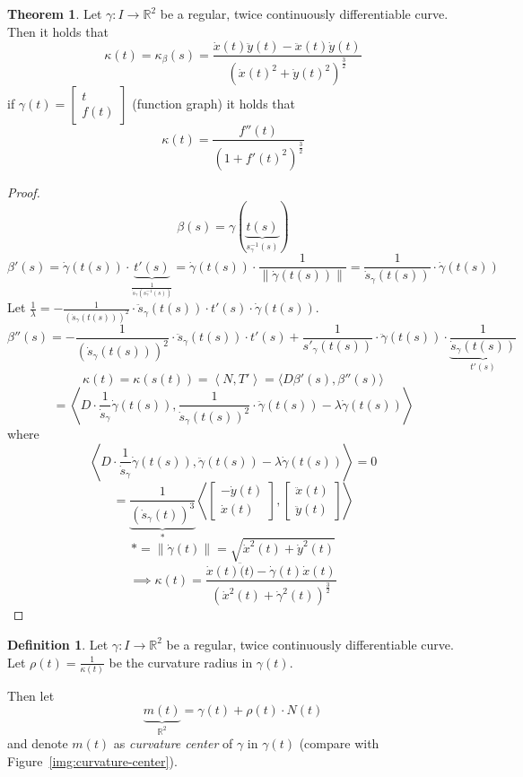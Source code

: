 \documentclass[a4paper,landscape,twocolumn]{article}
\theoremstyle{definition}
\newtheorem{theorem}{Theorem}
\newtheorem{defi}{Definition}
\newcommand\norm[1]{\left\|#1\right\|}
\newcommand\ang[2]{\left\langle#1,#2\right\rangle}
\begin{document}
\begin{theorem}
  Let $\gamma: I \to \mathbb R^2$ be a regular, twice continuously differentiable
  curve. Then it holds that
  \[ \kappa(t) = \kappa_{\beta}(s) = \frac{\dot{x}(t) \ddot{y}(t) - \ddot{x}(t) \dot{y}(t)}{(\dot{x}(t)^2 + \dot{y}(t)^2)^{\frac32}} \]
  if $\gamma(t) = \begin{bmatrix} t \\ f(t) \end{bmatrix}$ (function graph) it holds that
  \[ \kappa(t) = \frac{f''(t)}{(1 + f'(t)^2)^{\frac32}} \]
\end{theorem}

\begin{proof}
  \[ \beta(s) = \gamma(\underbrace{t(s)}_{s_\gamma^{-1}(s)}) \]
  \[
    \beta'(s) =
    \dot{\gamma}(t(s)) \cdot \underbrace{t'(s)}_{\frac{1}{\dot{s}_{\gamma}(s_\gamma^{-1}(s))}}
    = \dot{\gamma}(t(s)) \cdot \frac{1}{\norm{\dot{\gamma}(t(s))}}
    = \frac{1}{\dot{s}_\gamma(t(s))} \cdot \dot{\gamma}(t(s))
  \]
  Let $\frac1{\lambda} = -\frac{1}{(\dot{s}_\gamma(t(s)))^2} \cdot \ddot{s}_\gamma(t(s)) \cdot t'(s) \cdot \dot{\gamma}(t(s))$.
  \[
    \beta''(s) = -\frac{1}{(\dot{s}_\gamma(t(s)))^2} \cdot \ddot{s}_\gamma(t(s)) \cdot t'(s)
    + \frac{1}{s'_\gamma(t(s))} \cdot \ddot{\gamma}(t(s)) \cdot \underbrace{\frac{1}{\dot{s}_\gamma(t(s))}}_{t'(s)}
  \] \[
    \kappa(t) = \kappa(s(t)) = \ang{N}{T'} = \langle D\beta'(s), \beta''(s)\rangle
  \] \[
    = \ang{D \cdot \frac{1}{\dot{s}_\gamma} \dot\gamma(t(s))}{\frac{1}{\dot{s}_\gamma(t(s))^2} \cdot \ddot{\gamma}(t(s)) - \lambda \dot{\gamma}(t(s))}
  \]
  where
  \[
    \ang{D \cdot \frac{1}{\dot{s}_\gamma} \dot\gamma(t(s))}{\ddot{\gamma}(t(s)) - \lambda \dot{\gamma}(t(s))} = 0
  \]
  \[ = \underbrace{\frac{1}{(\dot{s}_\gamma(t))^3}}_{*}
  \ang{\begin{bmatrix} -\dot{y}(t) \\ \dot{x}(t) \end{bmatrix}}%
      {\begin{bmatrix} \ddot{x}(t) \\ \ddot{y}(t) \end{bmatrix}} \]
  \[ * = \norm{\dot\gamma(t)} = \sqrt{\dot{x}^2(t) + \dot{y}^2(t)} \]
  \[
    \implies
    \kappa(t) = \frac{\dot{x}(t) \ddot(t) - \dot\gamma(t) \dot{x}(t)}{(\dot{x}^2(t) + \dot{\gamma}^2(t))^{\frac32}}
  \]
\end{proof}

\begin{defi}
  Let $\gamma: I \to \mathbb R^2$ be a regular, twice continuously differentiable curve.
  Let $\rho(t) = \frac{1}{\kappa(t)}$ be the curvature radius in $\gamma(t)$.

  Then let
  \[ \underbrace{m(t)}_{\mathbb R^2} = \gamma(t) + \rho(t) \cdot N(t) \]
  and denote $m(t)$ as \emph{curvature center} of $\gamma$ in $\gamma(t)$
  (compare with Figure~\ref{img:curvature-center}).
\end{defi}
\end{document}
